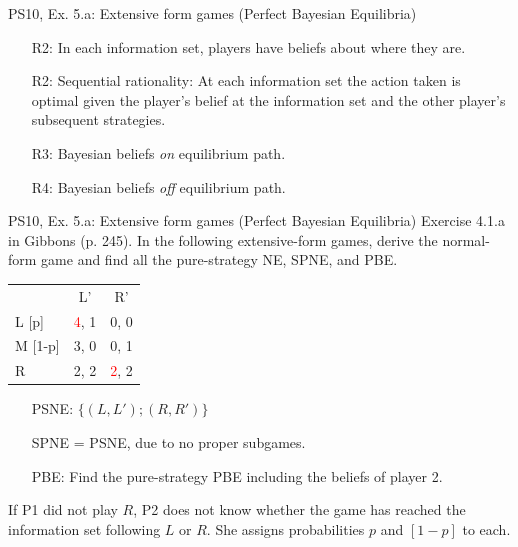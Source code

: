 \begin{frame}{PS10, Ex. 5.a: Extensive form games (Perfect Bayesian Equilibria)}
\begin{multicols}{2}
      \begin{itemize}
        \item[R2:] In each information set, players have beliefs about where they are.
        \item[R2:] Sequential rationality: At each information set the action taken is optimal given the player's belief at the information set and the other player's subsequent strategies.
        \item[R3:] Bayesian beliefs \textit{on} equilibrium path.
        \item[R4:] Bayesian beliefs \textit{off} equilibrium path.
      \end{itemize}
      \vfill\null
    \end{multicols}
\end{frame}
\begin{frame}{PS10, Ex. 5.a: Extensive form games (Perfect Bayesian Equilibria)}
    Exercise 4.1.a in Gibbons (p. 245). In the following extensive-form games, derive the normal-form game and find all the pure-strategy NE, SPNE, and PBE.
    \vspace{-8pt}
    \begin{multicols}{2}
      \begin{table}
        \begin{tabular}{l|c|c|}
          \multicolumn{1}{c}{} & \multicolumn{1}{c}{L'} & \multicolumn{1}{c}{R'} \\\cline{2-3}
          L [p]   & \textcolor{red}{4}, \color{blue}1 & 0, 0 \\\cline{2-3}
          M [1-p] & 3, 0 & 0, \color{blue}1 \\\cline{2-3}
          R       & 2, \color{blue}2 & \textcolor{red}{2}, \color{blue}2 \\\cline{2-3}
        \end{tabular}
      \end{table} \vspace{-4pt}
      \begin{itemize}
        \item[PSNE:] $\{(L,L');(R,R')\}$
        \item[SPNE =] PSNE, due to no proper subgames.
        \item[PBE:] Find the pure-strategy PBE including the beliefs of player 2.
      \end{itemize} \vspace{-4pt}
      If P1 did not play $R$, P2 does not know whether the game has reached the information set following $L$ or $R$. She assigns probabilities $p$ and $[1-p]$ to each.\\\smallskip

\end{multicols}
\end{frame}
